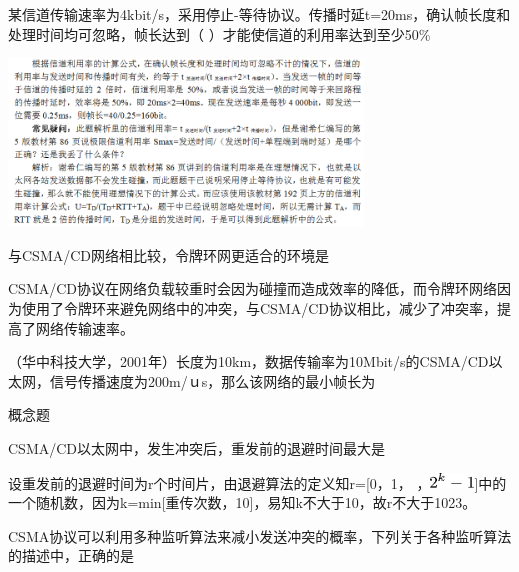 \question 某信道传输速率为4kbit/s，采用停止-等待协议。传播时延t=20ms，确认帧长度和处理时间均可忽略，帧长达到（
）才能使信道的利用率达到至少50\%
\par{}
\begin{solution}\includegraphics[width=3.70833in,height=1.76042in]{computerassets/4852416235FE9EA14F68B05403BF782C.png}
\end{solution}
\question 与CSMA/CD网络相比较，令牌环网更适合的环境是
\par{}
\begin{solution}CSMA/CD协议在网络负载较重时会因为碰撞而造成效率的降低，而令牌环网络因为使用了令牌环来避免网络中的冲突，与CSMA/CD协议相比，减少了冲突率，提高了网络传输速率。
\end{solution}
\question （华中科技大学，2001年）长度为10km，数据传输率为10Mbit/s的CSMA/CD以太网，信号传播速度为200m/ｕs，那么该网络的最小帧长为
\par{}
\begin{solution}概念题
\end{solution}
\question CSMA/CD以太网中，发生冲突后，重发前的退避时间最大是
\par{}
\begin{solution}设重发前的退避时间为r个时间片，由退避算法的定义知r={[}0，1，
，\includegraphics[width=0.45833in,height=0.16667in]{texmath/2116a45Cdpi7B3507D25Ek-1}{]}中的一个随机数，因为k=min{[}重传次数，10{]}，易知k不大于10，故r不大于1023。
\end{solution}
\question CSMA协议可以利用多种监听算法来减小发送冲突的概率，下列关于各种监听算法的描述中，正确的是
\par{}

